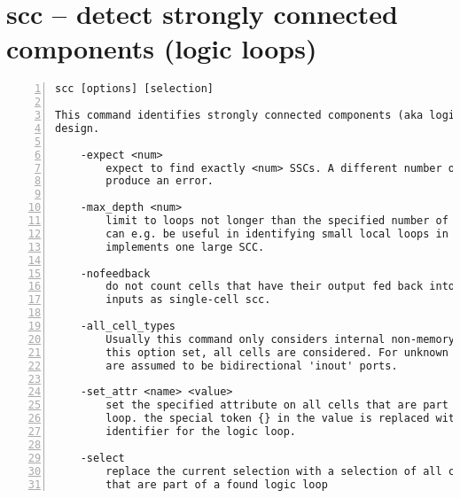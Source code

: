 \section{scc -- detect strongly connected components (logic loops)}
\label{cmd:scc}
\begin{lstlisting}[numbers=left,frame=single]
    scc [options] [selection]

This command identifies strongly connected components (aka logic loops) in the
design.

    -expect <num>
        expect to find exactly <num> SSCs. A different number of SSCs will
        produce an error.

    -max_depth <num>
        limit to loops not longer than the specified number of cells. This
        can e.g. be useful in identifying small local loops in a module that
        implements one large SCC.

    -nofeedback
        do not count cells that have their output fed back into one of their
        inputs as single-cell scc.

    -all_cell_types
        Usually this command only considers internal non-memory cells. With
        this option set, all cells are considered. For unknown cells all ports
        are assumed to be bidirectional 'inout' ports.

    -set_attr <name> <value>
        set the specified attribute on all cells that are part of a logic
        loop. the special token {} in the value is replaced with a unique
        identifier for the logic loop.

    -select
        replace the current selection with a selection of all cells and wires
        that are part of a found logic loop
\end{lstlisting}

